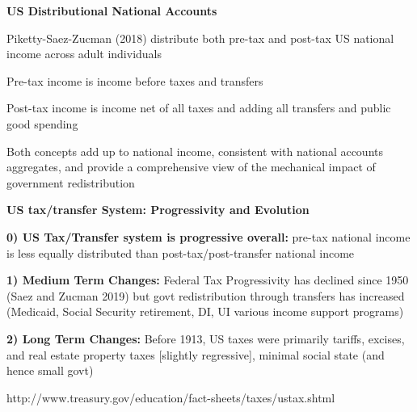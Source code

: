 \documentclass[landscape]{slides}
\begin{document}
\begin{slide}
\begin{center}
{\bf US Distributional National Accounts}
\end{center}
Piketty-Saez-Zucman (2018) distribute both pre-tax and post-tax US national income across adult individuals 

Pre-tax income is income before taxes and transfers

Post-tax income is income net of all taxes and adding all transfers and public good spending

Both concepts add up to national income, consistent with national accounts aggregates, and provide a comprehensive view of the mechanical impact
of government redistribution

\end{slide}

%

\begin{slide}

\end{slide}

\begin{slide}

\end{slide}

\begin{slide}
\begin{center}
{\bf US tax/transfer System: Progressivity and Evolution}
\end{center}
{\bf 0) US Tax/Transfer system is progressive overall:} pre-tax national income is less
equally distributed than post-tax/post-transfer national income 

{\bf 1) Medium Term Changes:} Federal Tax Progressivity has declined
since 1950 (Saez and Zucman 2019) but govt redistribution through transfers has increased (Medicaid, Social Security retirement, DI, UI
various income support programs)

{\bf 2) Long Term Changes:} Before 1913, US taxes were primarily
tariffs, excises, and real estate property taxes [slightly
regressive], minimal social state (and hence small govt)

http://www.treasury.gov/education/fact-sheets/taxes/ustax.shtml
\end{slide}
\end{document}
